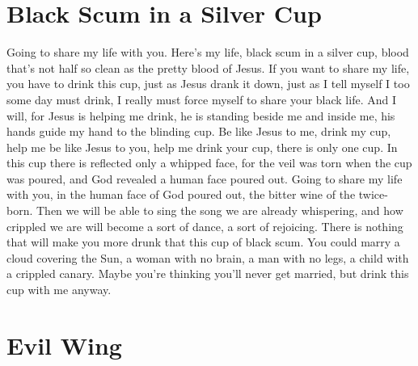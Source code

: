 \documentclass[english,11pt,letterpaper,onecolumn]{scrbook}
\begin{document}
\newpage
\section{Black Scum in a Silver Cup}

\begin{poem}
\begin{stanza}
Going to share my life with you.\verseline
Here's my life, black scum in a silver cup, blood that's not half so clean as the pretty blood of Jesus.\verseline
If you want to share my life, you have to drink this cup, just as Jesus drank it down, just as I tell myself I too some day must drink, I really must force myself to share your black life.\verseline
And I will, for Jesus is helping me drink, he is standing beside me and inside me, his hands guide my hand to the blinding cup.\verseline
Be like Jesus to me, drink my cup, help me be like Jesus to you, help me drink your cup, there is only one cup.\verseline
In this cup there is reflected only a whipped face, for the veil was torn when the cup was poured, and God revealed a human face poured out.\verseline
Going to share my life with you, in the human face of God poured out, the bitter wine of the twice-born.\verseline
Then we will be able to sing the song we are already whispering, and how crippled we are will become a sort of dance, a sort of rejoicing.\verseline
There is nothing that will make you more drunk that this cup of black scum.\verseline
You could marry a cloud covering the Sun, a woman with no brain, a man with no legs, a child with a crippled canary.\verseline
Maybe you're thinking you'll never get married, but drink this cup with me anyway.
\end{stanza}
\end{poem}


\newpage
\section{Evil Wing}
\end{document}
